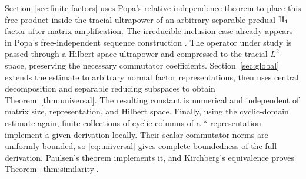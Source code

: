 Section~\ref{sec:finite-factors} uses Popa's relative independence
theorem \citep[Theorem~0.1(a)]{Popa2014} to place this free product
inside the tracial ultrapower of an arbitrary separable-predual
\({\rm II}_1\) factor after matrix amplification. The
irreducible-inclusion case already appears in Popa's free-independent
sequence construction
\citep[Theorem~2.1 and proof of Corollary~2.2]{Popa1995}.
The
operator under study is passed through a Hilbert space ultrapower and
compressed to the tracial \(L^2\)-space, preserving the necessary
commutator coefficients. Section~\ref{sec:global} extends the estimate
to arbitrary normal factor representations, then uses central
decomposition and separable reducing subspaces to obtain
Theorem~\ref{thm:universal}. The resulting constant is numerical and
independent of matrix size, representation, and Hilbert space.
Finally, using the cyclic-domain estimate again, finite collections
of cyclic columns of a \(*\)-representation implement a given
derivation locally.  Their scalar commutator norms
are uniformly bounded, so \eqref{eq:universal} gives complete
boundedness of the full derivation.  Paulsen's theorem implements it,
and Kirchberg's equivalence proves Theorem~\ref{thm:similarity}.
